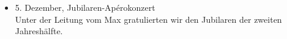 \begin{history}
\begin{itemize}
        \item 5. Dezember, Jubilaren-Apérokonzert\\
              Unter der Leitung vom Max gratulierten wir den Jubilaren der
              zweiten Jahreshälfte.

    \end{itemize}

\end{history}
